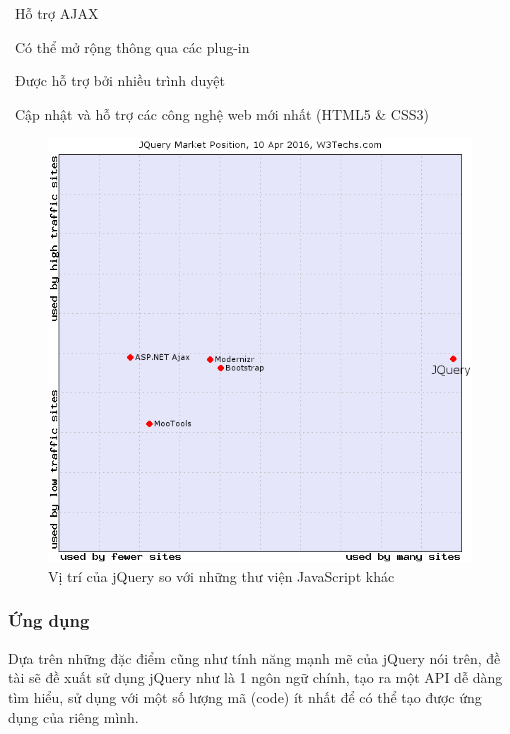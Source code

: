 \documentclass[12pt,a4paper,oneside]{article}
\begin{document}
\indent \textbullet \ Hỗ trợ AJAX

\indent \textbullet \ Có thể mở rộng thông qua các plug-in

\indent \textbullet \ Được hỗ trợ bởi nhiều trình duyệt

\indent \textbullet \ Cập nhật và hỗ trợ các công nghệ web mới nhất (HTML5 \& CSS3)

\begin{center}
    \begin{figure}[htp]
    \begin{center}
     \includegraphics[scale=.6]{image/js-jquery}
    \end{center}
    \caption{Vị trí của jQuery so với những thư viện JavaScript khác}
    \label{refhinh13}
    \end{figure}
\end{center}

\subsubsection{Ứng dụng}
Dựa trên những đặc điểm cũng như tính năng mạnh mẽ của jQuery nói trên, đề tài sẽ đề xuất sử dụng jQuery như là 1 ngôn ngữ chính, tạo ra một API dễ dàng tìm hiểu, sử dụng với một số lượng mã (code) ít nhất để có thể tạo được ứng dụng của riêng mình.
\end{document}
